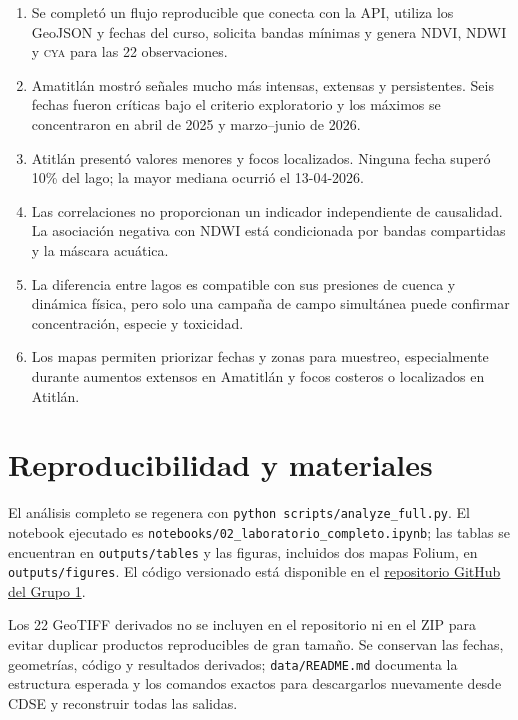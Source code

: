 \documentclass[11pt,letterpaper]{article}
\newcommand{\CYA}{\textsc{cya}}
\begin{document}
\begin{enumerate}
\item Se completó un flujo reproducible que conecta con la API, utiliza los GeoJSON y fechas del curso, solicita bandas mínimas y genera NDVI, NDWI y \CYA{} para las 22 observaciones.
\item Amatitlán mostró señales mucho más intensas, extensas y persistentes. Seis fechas fueron críticas bajo el criterio exploratorio y los máximos se concentraron en abril de 2025 y marzo--junio de 2026.
\item Atitlán presentó valores menores y focos localizados. Ninguna fecha superó 10\% del lago; la mayor mediana ocurrió el 13-04-2026.
\item Las correlaciones no proporcionan un indicador independiente de causalidad. La asociación negativa con NDWI está condicionada por bandas compartidas y la máscara acuática.
\item La diferencia entre lagos es compatible con sus presiones de cuenca y dinámica física, pero solo una campaña de campo simultánea puede confirmar concentración, especie y toxicidad.
\item Los mapas permiten priorizar fechas y zonas para muestreo, especialmente durante aumentos extensos en Amatitlán y focos costeros o localizados en Atitlán.
\end{enumerate}

\section*{Reproducibilidad y materiales}

El análisis completo se regenera con \texttt{python scripts/analyze\_full.py}. El notebook ejecutado es \texttt{notebooks/02\_laboratorio\_completo.ipynb}; las tablas se encuentran en \texttt{outputs/tables} y las figuras, incluidos dos mapas Folium, en \texttt{outputs/figures}. El código versionado está disponible en el \href{https://github.com/DanielBarillasM/Laboratorio-4.-Analisis-Geoespacial-y-sensores-remotos_DS_Grupo-1}{repositorio GitHub del Grupo 1}.

Los 22 GeoTIFF derivados no se incluyen en el repositorio ni en el ZIP para evitar duplicar productos reproducibles de gran tamaño. Se conservan las fechas, geometrías, código y resultados derivados; \texttt{data/README.md} documenta la estructura esperada y los comandos exactos para descargarlos nuevamente desde CDSE y reconstruir todas las salidas.
\end{document}

